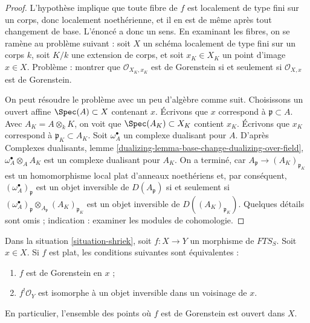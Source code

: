 \begin{proof}
L'hypothèse implique que toute fibre de $f$ est localement de type fini sur un corps, donc localement noethérienne, et il en est de même après tout changement de base. L'énoncé a donc un sens. En examinant les fibres, on se ramène au problème suivant : soit $X$ un schéma localement de type fini sur un corps $k$, soit $K/k$ une extension de corps, et soit $x_K \in X_K$ un point d'image $x \in X$. Problème : montrer que $\mathcal{O}_{X_K, x_K}$ est de Gorenstein si et seulement si $\mathcal{O}_{X, x}$ est de Gorenstein.

\medskip\noindent
On peut résoudre le problème avec un peu d'algèbre comme suit. Choisissons un ouvert affine $\Spec(A) \subset X$ contenant $x$. Écrivons que $x$ correspond à $\mathfrak p \subset A$. Avec $A_K = A \otimes_k K$, on voit que $\Spec(A_K) \subset X_K$ contient $x_K$. Écrivons que $x_K$ correspond à $\mathfrak p_K \subset A_K$. Soit $\omega_A^\bullet$ un complexe dualisant pour $A$. D'après Complexes dualisants, lemme \ref{dualizing-lemma-base-change-dualizing-over-field}, $\omega_A^\bullet \otimes_A A_K$ est un complexe dualisant pour $A_K$. On a terminé, car $A_\mathfrak p \to (A_K)_{\mathfrak p_K}$ est un homomorphisme local plat d'anneaux noethériens et, par conséquent, $(\omega_A^\bullet)_\mathfrak p$ est un objet inversible de $D(A_\mathfrak p)$ si et seulement si $(\omega_A^\bullet)_\mathfrak p \otimes_{A_\mathfrak p} (A_K)_{\mathfrak p_K}$ est un objet inversible de $D((A_K)_{\mathfrak p_K})$. Quelques détails sont omis ; indication : examiner les modules de cohomologie.
\end{proof}

\begin{lemma}
\label{lemma-affine-flat-Noetherian-gorenstein}
Dans la situation \ref{situation-shriek}, soit $f : X \to Y$ un morphisme de $\textit{FTS}_S$. Soit $x \in X$. Si $f$ est plat, les conditions suivantes sont équivalentes :
\begin{enumerate}
\item $f$ est de Gorenstein en $x$ ;
\item $f^!\mathcal{O}_Y$ est isomorphe à un objet inversible dans un voisinage de $x$.
\end{enumerate}
En particulier, l'ensemble des points où $f$ est de Gorenstein est ouvert dans $X$.
\end{lemma}


